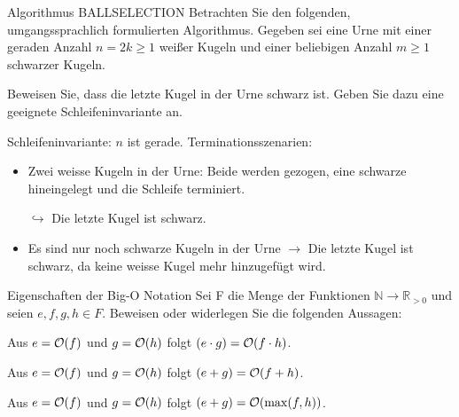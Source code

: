 \documentclass{exercisesheet}
\begin{document}
\begin{exercise}{Algorithmus BALLSELECTION}
  Betrachten Sie den folgenden, umgangssprachlich formulierten Algorithmus. Gegeben sei eine Urne mit einer geraden Anzahl $n = 2k \ge 1$ weißer Kugeln und einer beliebigen Anzahl $m \geq 1$ schwarzer Kugeln.\par
  \begin{algorithm}[ht]
    \caption{BALLSELECTION}
  \end{algorithm}
  \noindent Beweisen Sie, dass die letzte Kugel in der Urne schwarz ist. Geben Sie dazu eine geeignete Schleifeninvariante an.

  \begin{solution}
    Schleifeninvariante: $n$ ist gerade. Terminationsszenarien:
    \begin{itemize}
      \item Zwei weisse Kugeln in der Urne: Beide werden gezogen, eine schwarze hineingelegt und die Schleife terminiert.\par $\hookrightarrow$ Die letzte Kugel ist schwarz.
      \item Es sind nur noch schwarze Kugeln in der Urne $\to$ Die letzte Kugel ist schwarz, da keine weisse Kugel mehr hinzugefügt wird.
    \end{itemize}
  \end{solution}
\end{exercise}

\begin{eexercises}{Eigenschaften der Big-O Notation}{
    Sei F die Menge der Funktionen $\mathbb{N} \rightarrow \mathbb{R}_{>0}$ und seien $e, f, g, h \in F$. Beweisen oder widerlegen Sie die folgenden Aussagen:
  }
  \item Aus $e = \mathcal{O}(f)$ und $g = \mathcal{O}(h)$ folgt $(e \cdot g) = \mathcal{O}(f \cdot h)$.
  \item Aus $e = \mathcal{O}(f)$ und $g = \mathcal{O}(h)$ folgt $(e + g) = \mathcal{O}(f + h)$.
  \item Aus $e = \mathcal{O}(f)$ und $g = \mathcal{O}(h)$ folgt $(e + g) = \mathcal{O}(\max(f,h))$.
\end{eexercises}
\end{document}
